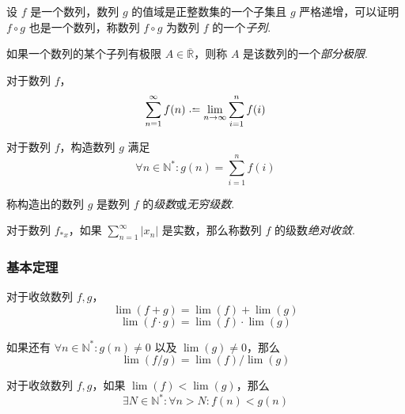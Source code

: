 \begin{definition}
    设 $f$ 是一个数列，数列 $g$ 的值域是正整数集的一个子集且 $g$ 严格递增，可以证明 $f\circ g$ 也是一个数列，称数列 $f \circ g$ 为数列 $f$ 的一个\emph{子列}.
\end{definition}\vspace{9pt}

\begin{definition}
    如果一个数列的某个子列有极限 $A \in \overline{\mathbb{R}}$，则称 $A$ 是该数列的一个\emph{部分极限}.
\end{definition}\vspace{9pt}

\begin{definition}
    对于数列 $f$，
    \[\sum_{n=1}^{\infty} f(n) \defeq \lim_{n \rightarrow \infty} \sum_{i=1}^{n} f(i)\]
\end{definition}\vspace{9pt}

\begin{definition}
    对于数列 $f$，构造数列 $g$ 满足
    \[\forall n\in \mathbb{N}^*: g(n) = \sum_{i=1}^{n} f(i)\]
    
    称构造出的数列 $g$ 是数列 $f$ 的\emph{级数}或\emph{无穷级数}.
\end{definition}\vspace{9pt}

\begin{definition}
    对于数列 $f_{*x}$，如果 $\displaystyle \sum_{n=1}^{\infty} \lvert x_n\rvert$ 是实数，那么称数列 $f$ 的级数\emph{绝对收敛}.
\end{definition}

\subsubsection{基本定理}
\begin{theorem}
    对于收敛数列 $f,g$，
    \[\lim(f+g) = \lim(f) + \lim(g)\]
    \[\lim(f \cdot g) = \lim(f) \cdot \lim(g)\]

    如果还有 $\forall n \in \mathbb{N}^*: g(n) \neq 0$ 以及 $\lim(g) \neq 0$，那么
    \[\lim(f/g) = \lim(f)/\lim(g)\]
\end{theorem}\vspace{9pt}

\begin{theorem}
    对于收敛数列 $f,g$，如果 $\lim(f) < \lim(g)$，那么
    \[\exists N \in \mathbb{N}^*: \forall n > N: f(n) < g(n)\]
\end{theorem}\vspace{9pt}

